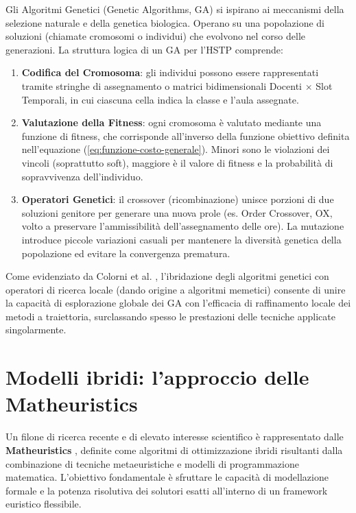 Gli Algoritmi Genetici (Genetic Algorithms, GA) si ispirano ai meccanismi della selezione naturale e della genetica biologica. Operano su una popolazione di soluzioni (chiamate cromosomi o individui) che evolvono nel corso delle generazioni.
La struttura logica di un GA per l'HSTP comprende:
\begin{enumerate}
    \item \textbf{Codifica del Cromosoma}: gli individui possono essere rappresentati tramite stringhe di assegnamento o matrici bidimensionali Docenti $\times$ Slot Temporali, in cui ciascuna cella indica la classe e l'aula assegnate.
    \item \textbf{Valutazione della Fitness}: ogni cromosoma è valutato mediante una funzione di fitness, che corrisponde all'inverso della funzione obiettivo definita nell'equazione (\ref{eq:funzione-costo-generale}). Minori sono le violazioni dei vincoli (soprattutto soft), maggiore è il valore di fitness e la probabilità di sopravvivenza dell'individuo.
    \item \textbf{Operatori Genetici}: il crossover (ricombinazione) unisce porzioni di due soluzioni genitore per generare una nuova prole (es. Order Crossover, OX, volto a preservare l'ammissibilità dell'assegnamento delle ore). La mutazione introduce piccole variazioni casuali per mantenere la diversità genetica della popolazione ed evitare la convergenza prematura.
\end{enumerate}

Come evidenziato da Colorni et al. \cite{colorni1998metaheuristics}, l'ibridazione degli algoritmi genetici con operatori di ricerca locale (dando origine a algoritmi memetici) consente di unire la capacità di esplorazione globale dei GA con l'efficacia di raffinamento locale dei metodi a traiettoria, surclassando spesso le prestazioni delle tecniche applicate singolarmente.

\section{Modelli ibridi: l'approccio delle Matheuristics}
\label{sec:matheuristics}

Un filone di ricerca recente e di elevato interesse scientifico è rappresentato dalle \textbf{Matheuristics} \cite{maniezzo2021matheuristics}, definite come algoritmi di ottimizzazione ibridi risultanti dalla combinazione di tecniche metaeuristiche e modelli di programmazione matematica. L'obiettivo fondamentale è sfruttare le capacità di modellazione formale e la potenza risolutiva dei solutori esatti all'interno di un framework euristico flessibile.

